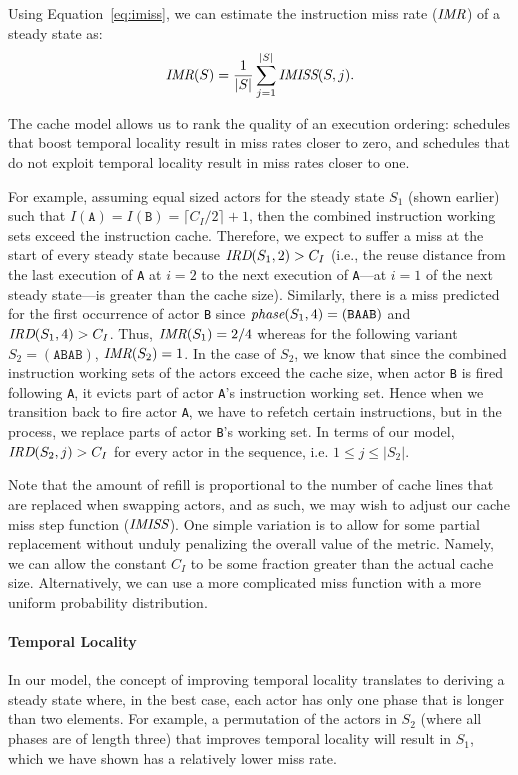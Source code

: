 Using 
Equation~\ref{eq:imiss}, we can estimate the instruction miss
rate ($\mbox{\it IMR}$) of a steady state as: 
\begin{equation}
\label{eq:imr}
  \mbox{\it IMR}(S) = \frac{1}{|S|}\sum_{j=1}^{|S|} \mbox{\it IMISS}(S,j).
\end{equation}

The cache model allows us to rank the quality of an
execution ordering: schedules that boost temporal locality
result in miss rates closer to zero, and schedules that do not
exploit temporal locality result in miss rates closer to one.

For example, assuming equal sized actors for the steady
state $S_1$ (shown earlier) such that
$I(\texttt{A})=I(\texttt{B})=\lceil{C_I/2}\rceil+1$, then the
combined instruction working 
sets exceed the instruction cache. Therefore, 
we expect to suffer a miss at the start of every
steady state because $\mbox{\it IRD}(S_1, 2)>C_I$ (i.e., the reuse distance
from the last execution of \texttt{A} at $i=2$ to the next execution
of \texttt{A}---at $i=1$ of the next steady state---is greater than the cache
size). Similarly, there is a 
miss predicted for the first occurrence of actor \texttt{B} since
$\mbox{\it phase}(S_1,4)=(\texttt{BAAB})$ and 
$\mbox{\it IRD}(S_1, 4)>C_I$. Thus, $\mbox{\it IMR}(S_1)=2/4$ whereas for the
following variant $S_2=(\texttt{ABAB})$, $\mbox{\it IMR}(S_2)=1$.
In the case of $S_2$, we know that since the combined
instruction working sets of the actors exceed the cache size, when
actor \texttt{B} is fired following \texttt{A}, it evicts part of
actor \texttt{A}'s instruction working set. Hence when we transition
back to fire actor \texttt{A}, we have to refetch certain
instructions, but in the process, we replace parts of actor
\texttt{B}'s working set. In terms of our model, $\mbox{\it IRD}(S_2,j)>C_I$
for every actor in the sequence, i.e. $1\le j\le|S_2|$.

Note that the
amount of refill is proportional to the number of cache lines that are
replaced when swapping actors, and as such, we may wish to adjust
our cache miss step function ($\mbox{\it IMISS}$). One simple variation is to allow for
some partial replacement without unduly penalizing the overall value
of the metric. Namely, we can allow the constant $C_I$ to be some
fraction greater than the actual cache size. Alternatively, we can use
a more complicated miss function with a more uniform probability
distribution.

\paragraph*{Temporal Locality} In our model, the concept of improving
temporal locality translates to deriving a steady state where, in the
best case, each actor has only one phase that is longer than two
elements. For example, a permutation of the actors in $S_2$ (where all
phases are of length three) that improves temporal locality
will result in $S_1$, which we have shown has a relatively lower miss rate.


